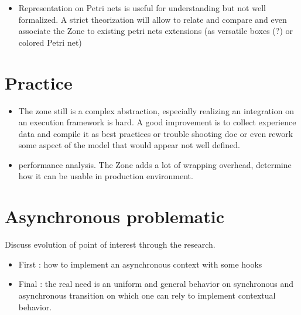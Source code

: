 \begin{itemize}
\item Representation on Petri nets is useful for understanding but not well formalized. A strict theorization will allow to relate and compare and even associate the Zone to existing petri nets extensions (as versatile boxes (?) or colored Petri net)
\end{itemize}

\section{Practice}

\begin{itemize}
\item The zone still is a complex abstraction, especially realizing an integration on an execution framework is hard. A good improvement is to collect experience data and compile it as best practices or trouble shooting doc or even rework some aspect of the model that would appear not well defined.
\item performance analysis. The Zone adds a lot of wrapping overhead, determine how it can be usable in production environment.
\end{itemize}


\section{Asynchronous problematic}

Discuss evolution of point of interest through the research.

\begin{itemize}
\item First : how to implement an asynchronous context with some hooks
\item Final : the real need is an uniform and general behavior on synchronous and asynchronous transition on which one can rely to implement contextual behavior.
\end{itemize}